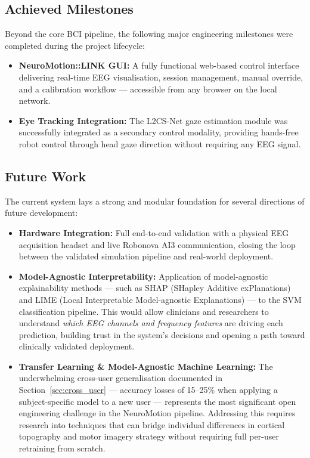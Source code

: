 \documentclass[12pt, a4paper, oneside]{report}
\begin{document}
\begin{description}
\subsection*{Achieved Milestones}

Beyond the core BCI pipeline, the following major engineering milestones were
completed during the project lifecycle:

\begin{itemize}
    \item \textbf{NeuroMotion::LINK GUI:} A fully functional web-based control
    interface delivering real-time EEG visualisation, session management,
    manual override, and a calibration workflow --- accessible from any browser
    on the local network.

    \item \textbf{Eye Tracking Integration:} The L2CS-Net gaze estimation
    module was successfully integrated as a secondary control modality, providing
    hands-free robot control through head gaze direction without requiring any
    EEG signal.
\end{itemize}

\subsection*{Future Work}

The current system lays a strong and modular foundation for several directions of
future development:

\begin{itemize}
    \item \textbf{Hardware Integration:} Full end-to-end validation with a physical
    EEG acquisition headset and live Robonova AI3 communication, closing the loop
    between the validated simulation pipeline and real-world deployment.

    \item \textbf{Model-Agnostic Interpretability:} Application of model-agnostic
    explainability methods --- such as SHAP (SHapley Additive exPlanations) and
    LIME (Local Interpretable Model-agnostic Explanations) --- to the SVM
    classification pipeline. This would allow clinicians and researchers to
    understand \textit{which EEG channels and frequency features} are driving each
    prediction, building trust in the system's decisions and opening a path toward
    clinically validated deployment.

    \item \textbf{Transfer Learning \& Model-Agnostic Machine Learning:}
    The underwhelming cross-user generalisation documented in
    Section~\ref{sec:cross_user} --- accuracy losses of 15--25\% when applying a
    subject-specific model to a new user --- represents the most significant open
    engineering challenge in the NeuroMotion pipeline. Addressing this requires
    research into techniques that can bridge individual differences in cortical
    topography and motor imagery strategy without requiring full per-user
    retraining from scratch.


\end{itemize}
\end{description}
\end{document}
